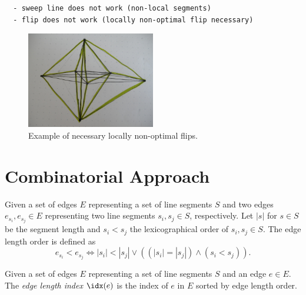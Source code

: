 \begin{verbatim}
  - sweep line does not work (non-local segments)
  - flip does not work (locally non-optimal flip necessary)
\end{verbatim}

\begin{figure}[ht]
  \centering
  \includegraphics[width=0.5\textwidth]{img/example_nonoptimal_flips.jpg}
  \caption{Example of necessary locally non-optimal flips.\label{fig:nonoptimal_flips}}
\end{figure}

\section{Combinatorial Approach}


\begin{definition}
  \label{def:edge_length_order}
  Given a set of edges \(E\) representing a set of line segments
  \(S\) and two edges \(e_{s_i}, e_{s_j} \in E\) representing two
  line segments \(s_i,s_j \in S\), respectively. Let \(|s|\) for
  \(s \in S\) be the segment length and \( s_i < s_j \) the
  lexicographical order of \(s_i, s_j \in S\). The edge length
  order is defined as  
  \[
    e_{s_i} < e_{s_j}
    \iff |s_i| < |s_j|
    \lor ((|s_i| = |s_j|) \land (s_i < s_j)).
  \]
\end{definition}


\begin{definition}
  \label{def:edge_length_index}
  Given a set of edges \(E\) representing a set of line segments
  \(S\) and an edge \(e \in E\). The \emph{edge length index}
  \(\idx(e)\) is the index of \(e\) in \(E\) sorted by 
  edge length order.
\end{definition}


